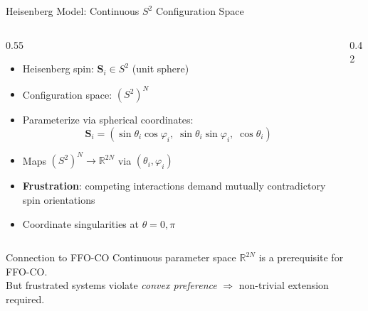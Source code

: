 \documentclass[10pt,aspectratio=169]{beamer}
\begin{document}
\begin{frame}{Heisenberg Model: Continuous $S^2$ Configuration Space}
\begin{columns}[T]
\begin{column}{0.55\textwidth}
  \begin{itemize}
    \item Heisenberg spin: $\bm{S}_i \in S^2$ (unit sphere)
    \item Configuration space: $(S^2)^N$
    \item Parameterize via spherical coordinates:
      \[
        \bm{S}_i = (\sin\theta_i\cos\varphi_i,\;
                     \sin\theta_i\sin\varphi_i,\;
                     \cos\theta_i)
      \]
    \item Maps $(S^2)^N \to \mathbb{R}^{2N}$ via $(\theta_i,\varphi_i)$
    \item \textbf{Frustration}: competing interactions demand
          mutually contradictory spin orientations
    \item Coordinate singularities at $\theta=0,\pi$
  \end{itemize}
\end{column}
\begin{column}{0.42\textwidth}
  \centering
\end{column}
\end{columns}

\vspace{4pt}
\begin{block}{Connection to FFO-CO}
Continuous parameter space $\mathbb{R}^{2N}$ is a prerequisite for FFO-CO.\\
But frustrated systems violate \emph{convex preference} $\Rightarrow$ non-trivial extension required.
\end{block}
\end{frame}
\end{document}
